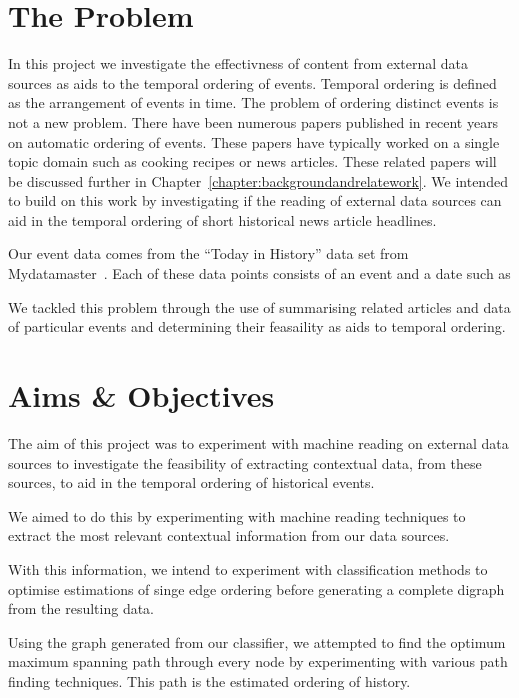\documentclass[bsc,frontabs,twoside,singlespacing,parskip,deptreport]{infthesis}     %
\begin{document}
\section{The Problem}
In this project we investigate the effectivness of content from external data sources as aids to the temporal
ordering of events. Temporal ordering is defined as the arrangement of events in time.
The problem of ordering distinct events is not a new problem. There have been numerous papers published
in recent years on automatic ordering of events. These papers have typically worked on a single
topic domain such as cooking recipes or news articles. These related papers will be discussed further in Chapter~\ref{chapter:backgroundandrelatework}.
We intended to build on this work by
investigating if the reading of external data sources can aid in the temporal ordering of short
historical news article headlines.

Our event data comes from the ``Today in History'' data set from Mydatamaster~\cite{mydatamaster}. Each of these data points consists
of an event and a date such as
\begin{equation}
  [ \text{``Alaska becomes 49th State''}, \text{``1959-01-01''} ]\nonumber
\end{equation}


We tackled this problem through the use of summarising related articles and data of particular
events and determining their feasaility as aids to temporal ordering. 

\section{Aims \& Objectives}
The aim of this project was to experiment with machine reading on external data sources to
investigate the feasibility of extracting contextual data, from these sources, to aid in the
temporal ordering of historical events.

We aimed to do this by experimenting with machine reading techniques to extract the most
relevant contextual information from our data sources.

With this information, we intend to experiment with classification methods to optimise estimations
of singe edge ordering before generating a complete digraph from the resulting data.

Using the graph generated from our classifier, we attempted to find the optimum maximum spanning path
through every node by experimenting with various path finding techniques.
This path is the estimated ordering of history.
\end{document}
